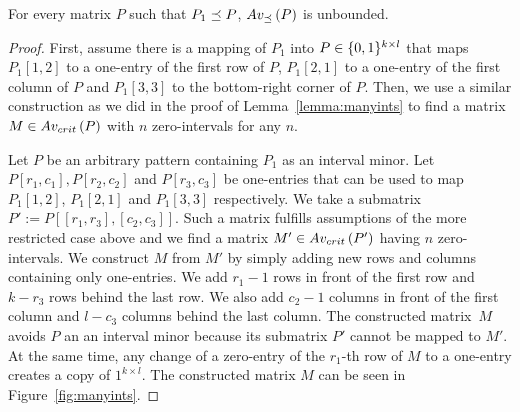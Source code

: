 \begin{thm}
For every matrix $P$ such that $P_1\preceq P$, $Av_{\preceq}\left(P\right)$ is unbounded.
\end{thm}
\begin{proof}
First, assume there is a mapping of $P_1$ into $P\in\{0,1\}^{k\times l}$ that maps $P_1[1,2]$ to a one-entry of the first row of $P$, $P_1[2,1]$ to a one-entry of the first column of $P$ and $P_1[3,3]$ to the bottom-right corner of $P$. Then, we use a similar construction as we did in the proof of Lemma~\ref{lemma:manyints} to find a matrix $M\in Av_{crit}\left(P\right)$ with $n$ zero-intervals for any $n$.

Let $P$ be an arbitrary pattern containing $P_1$ as an interval minor. Let $P[r_1,c_1],P[r_2,c_2]$ and $P[r_3,c_3]$ be one-entries that can be used to map $P_1[1,2]$, $P_1[2,1]$ and $P_1[3,3]$ respectively. We take a submatrix~$P':=P[[r_1,r_3],[c_2,c_3]]$. Such a matrix fulfills assumptions of the more restricted case above and we find a matrix $M'\in Av_{crit}\left(P'\right)$ having $n$ zero-intervals. We construct $M$ from $M'$ by simply adding new rows and columns containing only one-entries. We add $r_1-1$ rows in front of the first row and $k-r_3$ rows behind the last row. We also add $c_2-1$ columns in front of the first column and $l-c_3$ columns behind the last column. The constructed matrix~$M$ avoids $P$ an an interval minor because its submatrix $P'$ cannot be mapped to $M'$. At the same time, any change of a zero-entry of the $r_1$-th row of $M$ to a one-entry creates a copy of ${1}^{k\times l}$. The constructed matrix $M$ can be seen in Figure~\ref{fig:manyints}.


\end{proof}
